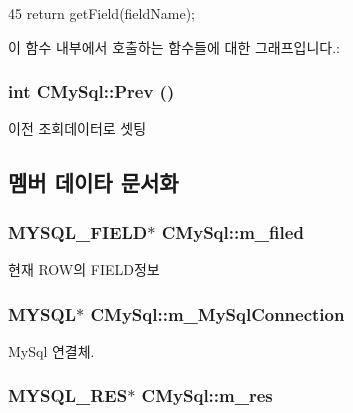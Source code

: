 \begin{DoxyCode}
45 { return getField(fieldName); }
\end{DoxyCode}


이 함수 내부에서 호출하는 함수들에 대한 그래프입니다.:\hypertarget{classCMySql_a579e51c63985da9d8a0bd9a6b463879a}{
\subsubsection[{Prev}]{\setlength{\rightskip}{0pt plus 5cm}int CMySql::Prev ()}}
\label{classCMySql_a579e51c63985da9d8a0bd9a6b463879a}


이전 조회데이터로 셋팅 

\subsection{멤버 데이타 문서화}
\hypertarget{classCMySql_a3733f6741b063ef20005dfe92893655b}{
\subsubsection[{m\_\-filed}]{\setlength{\rightskip}{0pt plus 5cm}MYSQL\_\-FIELD$\ast$ {\bf CMySql::m\_\-filed}}}
\label{classCMySql_a3733f6741b063ef20005dfe92893655b}


현재 ROW의 FIELD정보 \hypertarget{classCMySql_a74732c9ad7550228311df70ff7846870}{
\subsubsection[{m\_\-MySqlConnection}]{\setlength{\rightskip}{0pt plus 5cm}MYSQL$\ast$ {\bf CMySql::m\_\-MySqlConnection}}}
\label{classCMySql_a74732c9ad7550228311df70ff7846870}


MySql 연결체. \hypertarget{classCMySql_a434ad1058383726a4e0851bd4af83bed}{
\subsubsection[{m\_\-res}]{\setlength{\rightskip}{0pt plus 5cm}MYSQL\_\-RES$\ast$ {\bf CMySql::m\_\-res}}}
\label{classCMySql_a434ad1058383726a4e0851bd4af83bed}


